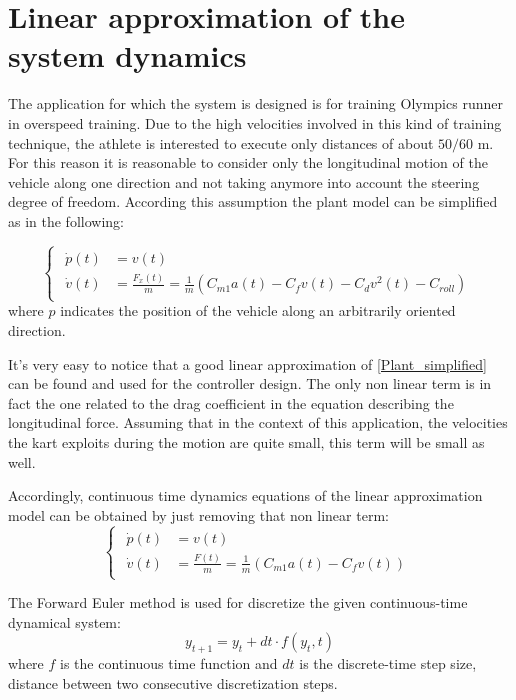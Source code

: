 \documentclass[a4paper,12pt,oneside]{book}
\begin{document}
\section{Linear approximation of the system dynamics}
The application for which the system is designed is for training Olympics runner in overspeed training. 
Due to the high velocities involved in this kind of training technique, the athlete is interested to execute only distances of about $50/60$ m. 
For this reason it is reasonable to consider only the longitudinal motion of the vehicle along one direction and not taking anymore into account the steering degree of freedom. 
According this assumption the plant model can be simplified as in the following:

\begin{equation}
\begin{cases}
 	\begin{aligned}
		\dot{p}(t) &= v(t) \\
		\dot{v}(t) &= \frac{F_x(t)}{m} = \frac{1}{m} (C_{m1} a(t) - C_f v(t) - C_d v^2(t) - C_{roll} )
	\end{aligned}
\end{cases}
\label{Plant_simplified}
\end{equation}
where $p$ indicates the position of the vehicle along an arbitrarily oriented direction.

\bigskip
It's very easy to notice that a good linear approximation of \ref{Plant_simplified} can be found and used for the controller design. 
The only non linear term is in fact the one related to the drag coefficient in the equation describing the longitudinal force.
Assuming that in the context of this application, the velocities the kart exploits during the motion are quite small, this term will be small as well.

Accordingly, continuous time dynamics equations of the linear approximation model can be obtained by just removing that non linear term:
\begin{equation}
\begin{cases}
 	\begin{aligned}
		\dot{p}(t) &= v(t) \\
		\dot{v}(t) &= \frac{F(t)}{m} = \frac{1}{m} (C_{m1} a(t) - C_f v(t) )
	\end{aligned}
\end{cases}
\label{CT_Linear_dynamics}
\end{equation}

\bigskip
The Forward Euler method is used for discretize the given continuous-time dynamical system:
\begin{equation}
    y_{t+1} = y_t + dt \cdot f(y_t, t) 
\end{equation}
where $f$ is the continuous time function and $dt$ is the discrete-time step size, distance between two consecutive discretization steps.
\end{document}
